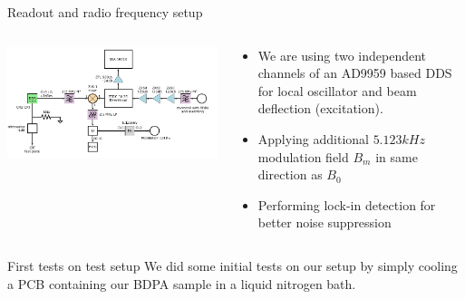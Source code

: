 \documentclass[final]{beamer}
\begin{document}
\begin{frame}[fragile]{}
\begin{columns}[T]
\begin{column}{.49\linewidth}
\begin{block}{\large Readout and radio frequency setup}
        \begin{columns}
          \begin{column}{0.6\columnwidth}
            \includegraphics[width=\columnwidth]{figures/rfsetup.png}
          \end{column}
          \begin{column}{0.4\columnwidth}
            \begin{itemize}
              \item We are using two independent channels of an AD9959 based DDS for
                  local oscillator and beam deflection (excitation).
              \item Applying additional $5.123 kHz$ modulation field $B_m$ in
                  same direction as $B_0$
              \item Performing lock-in detection for better noise suppression
            \end{itemize}
          \end{column}
        \end{columns}
      \end{block}

      \begin{block}{\large First tests on test setup}
        We did some initial tests on our setup by simply cooling a PCB containing our
        BDPA sample in a liquid nitrogen bath.


\end{block}
\end{column}
\end{columns}
\end{frame}
\end{document}

